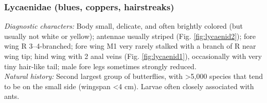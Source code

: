\documentclass[letterpaper, 11pt]{article}
\begin{document}
\subsubsection{Lycaenidae (blues, coppers, hairstreaks)}
\noindent{}\textit{Diagnostic characters:} Body small, delicate, and often brightly colored (but usually not white or yellow); antennae usually striped (Fig. \ref{fig:lycaenid2}); fore wing R 3--4-branched; fore wing M1 very rarely stalked with a branch of R near wing tip; hind wing with 2 anal veins (Fig. \ref{fig:lycaenid1}), occasionally with very tiny hair-like tail; male fore legs sometimes strongly reduced.\\

\noindent{}\textit{Natural history:} Second largest group of butterflies, with \textgreater{}5,000 species that tend to be on the small side (wingspan \textless4 cm). Larvae often closely associated with ants. 
\end{document}
